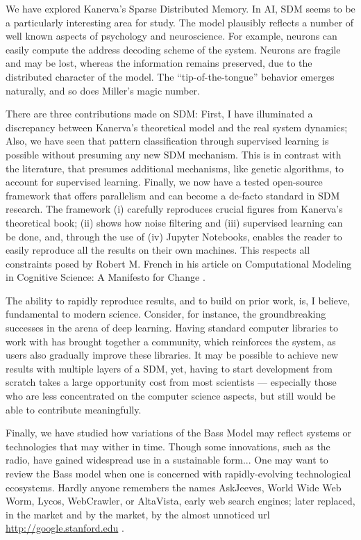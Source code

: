 


We have explored Kanerva’s Sparse Distributed Memory.   In AI, SDM seems to be a particularly interesting area for study.  The model plausibly reflects a number of well known aspects of psychology and neuroscience.  For example, neurons can easily compute the address decoding scheme of the system.  Neurons are fragile and may be lost, whereas the information remains preserved, due to the distributed character of the model.  The ``tip-of-the-tongue'' behavior emerges naturally, and so does Miller’s magic number.

There are three contributions made on SDM:  First, I have illuminated a discrepancy between Kanerva’s theoretical model and the real system dynamics; Also, we have seen that pattern classification through supervised learning is possible without presuming any new SDM mechanism. This is in contrast with the literature, that presumes additional mechanisms, like genetic algorithms, to account for supervised learning.  Finally, we now have a tested open-source framework that offers parallelism and can become a de-facto standard in SDM research.  The framework (i) carefully reproduces crucial figures from Kanerva’s theoretical book; (ii) shows how noise filtering and (iii) supervised learning can be done, and, through the use of (iv) Jupyter Notebooks, enables the reader to easily reproduce all the results on their own machines. This respects all constraints posed by Robert M. French in his article on Computational Modeling in Cognitive Science: A Manifesto for Change \citep{TOPS:TOPS1206}.

The ability to rapidly reproduce results, and to build on prior work, is, I believe, fundamental to modern science.  Consider, for instance, the groundbreaking successes in the arena of deep learning.  Having standard computer libraries to work with has brought together a community, which reinforces the system, as users also gradually improve these libraries. It may be possible to achieve new results with multiple layers of a SDM, yet, having to start development from scratch takes a large opportunity cost from most scientists --- especially those who are less concentrated on the computer science aspects, but still would be able to contribute meaningfully.  

Finally, we have studied how variations of the Bass Model may reflect systems or technologies that may wither in time. Though some innovations, such as the radio, have gained widespread use in a sustainable form... One may want to review the Bass model when one is concerned with rapidly-evolving technological ecosystems.  Hardly anyone remembers the names AskJeeves, World Wide Web Worm, Lycos, WebCrawler, or AltaVista, early web search engines; later replaced, in the market and by the market, by the almost unnoticed url \url{http://google.stanford.edu} \citep{brin1998anatomy}.


